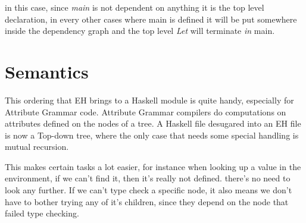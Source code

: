 in this case, since \emph{main} is not dependent on anything it is the top level declaration, in every other cases where main is defined it will be put somewhere inside the dependency graph and the top level \emph{Let} will terminate \emph{in} main.
\section{Semantics}

This ordering that EH brings to a Haskell module is quite handy, especially for Attribute Grammar code. Attribute Grammar compilers do computations on attributes defined on the nodes of a tree. A Haskell file desugared into an EH file is now a Top-down tree, where the only case that needs some special handling is mutual recursion. 

This makes certain tasks a lot easier, for instance when looking up a value in the environment, if we can't find it, then it's really not defined. there's no need to look any further. If we can't type check a specific node, it also means we don't have to bother trying any of it's children, since they depend on the node that failed type checking.
